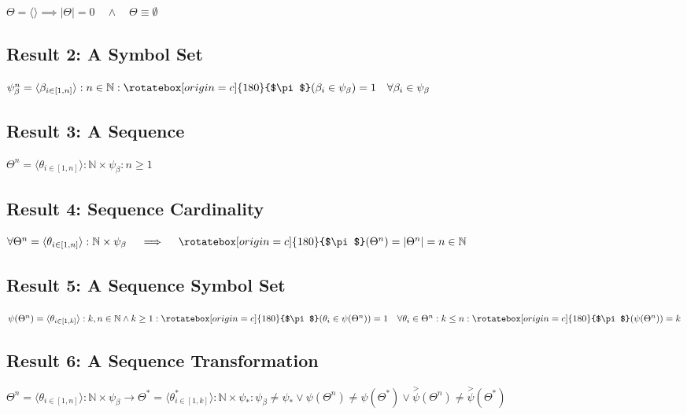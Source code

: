 \documentclass[a4paper, 18pt]{book} %
\newcommand{\invpi}{\rotatebox[origin=c]{180}{$\pi$}}
\begin{document}
\begin{appendices}
$\Theta = \langle \rangle \implies |\Theta| = 0 \quad \land \quad \Theta \equiv \emptyset$

\subsection{Result 2: A Symbol Set\cite{Lutalo2024gtnc}}

$\psi_\beta^n = \langle \beta_{i \in [1,n]} \rangle : n \in \mathbb{N} : \invpi(\beta_i \in \psi_\beta) = 1 \quad \forall \beta_i \in \psi_\beta$

\subsection{Result 3: A Sequence\cite{lnspaper}}
\label{RES3}

$\Theta^n = \langle \theta_{i \in [1,n]} \rangle : \mathbb{N} \times \psi_\beta : n \geq 1$

\subsection{Result 4: Sequence Cardinality\cite{adtpaper}\cite{Lutalo2024gtnc}}
\label{RES4}

$\forall \Theta^n = \langle \theta_{i \in [1,n]} \rangle : \mathbb{N} \times \psi_\beta \quad \implies \quad \invpi(\Theta^n) = |\Theta^n| = n \in \mathbb{N}$ 



\subsection{Result 5: A Sequence Symbol Set\cite{ossipaper}\cite{Lutalo2024gtnc}}
\label{RES5}

$\psi(\Theta^n) = \langle \theta_{i \in [1,k]} \rangle : k,n \in \mathbb{N} \land k \geq 1 : \invpi(\theta_i \in \psi(\Theta^n)) = 1 \quad \forall \theta_i \in \Theta^n : k \leq n : \invpi(\psi(\Theta^n)) = k$


\subsection{Result 6: A Sequence Transformation\cite{transformatics}\cite{lnspaper}}

$\Theta^n = \langle \theta_{i \in [1,n]} \rangle : \mathbb{N} \times \psi_\beta \rightarrow \Theta^* = \langle \theta^*_{i \in [1,k]} \rangle : \mathbb{N} \times \psi_* : \psi_\beta \neq \psi_{*} \lor \psi(\Theta^n) \neq \psi(\Theta^*) \lor \overset{>}{\psi}(\Theta^n) \neq \overset{>}{\psi}(\Theta^*)$



\end{appendices}
\end{document}
